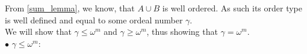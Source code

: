 From \ref{sum_lemma}, we know, that $A\cup B$ is well ordered. As such its order type is well 
defined and equal to some ordeal number $\gamma$. \\

We will show that $\gamma \leq \omega^m$ and $\gamma \geq \omega^m$, 
thus showing that $\gamma = \omega^m$. \\

$\bullet$ $\gamma \leq \omega^m$: \\



